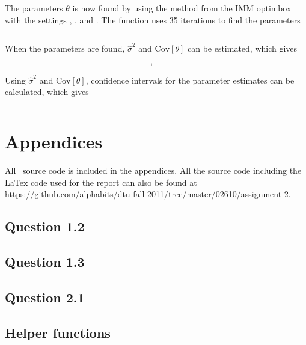 The parameters $\theta$ is now found by using the  method from the IMM optimbox with the settings , ,  and . The function uses 35 iterations to find the parameters

\begin{equation*}
    
\end{equation*}

When the parameters are found, $\hat{\sigma}^2$ and $\text{Cov}[\theta]$ can be estimated, which gives

\begin{equation*}
    , \quad 
\end{equation*}

Using $\hat{\sigma}^2$ and $\text{Cov}[\theta]$, confidence intervals for the parameter estimates can be calculated, which gives

\begin{equation*}
    
\end{equation*}


\pagebreak
\renewcommand\thesection{\Alph{section}}


\section{Appendices}

All \matlab\ source code is included in the appendices. All the source code
including the LaTex code used for the report can also be found at
\url{https://github.com/alphabits/dtu-fall-2011/tree/master/02610/assignment-2}.

\subsection{Question 1.2}\label{app:ex12}


\subsection{Question 1.3}\label{app:ex13}


\subsection{Question 2.1}\label{app:ex13}


\subsection{Helper functions}\label{app:helpers}



\pagebreak



